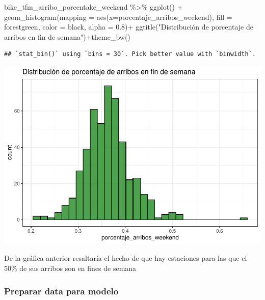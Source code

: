 \documentclass[
]{article}
\newenvironment{Shaded}{\begin{snugshade}}{\end{snugshade}}
\newcommand{\AttributeTok}[1]{\textcolor[rgb]{0.77,0.63,0.00}{#1}}
\newcommand{\FloatTok}[1]{\textcolor[rgb]{0.00,0.00,0.81}{#1}}
\newcommand{\FunctionTok}[1]{\textcolor[rgb]{0.00,0.00,0.00}{#1}}
\newcommand{\NormalTok}[1]{#1}
\newcommand{\SpecialCharTok}[1]{\textcolor[rgb]{0.00,0.00,0.00}{#1}}
\newcommand{\StringTok}[1]{\textcolor[rgb]{0.31,0.60,0.02}{#1}}
\begin{document}
\begin{Shaded}
\begin{Highlighting}[]
\NormalTok{bike\_tfm\_arribo\_porcentake\_weekend }\SpecialCharTok{\%\textgreater{}\%} 
    \FunctionTok{ggplot}\NormalTok{() }\SpecialCharTok{+}
    \FunctionTok{geom\_histogram}\NormalTok{(}\AttributeTok{mapping =} \FunctionTok{aes}\NormalTok{(}\AttributeTok{x=}\NormalTok{porcentaje\_arribos\_weekend),}
                   \AttributeTok{fill =} \StringTok{\textquotesingle{}forestgreen\textquotesingle{}}\NormalTok{,}
                   \AttributeTok{color =} \StringTok{\textquotesingle{}black\textquotesingle{}}\NormalTok{,}
                   \AttributeTok{alpha =} \FloatTok{0.8}\NormalTok{)}\SpecialCharTok{+} \FunctionTok{ggtitle}\NormalTok{(}\StringTok{"Distribución de porcentaje de arribos en fin de semana"}\NormalTok{)}\SpecialCharTok{+}\FunctionTok{theme\_bw}\NormalTok{()}
\end{Highlighting}
\end{Shaded}

\begin{verbatim}
## `stat_bin()` using `bins = 30`. Pick better value with `binwidth`.
\end{verbatim}

\includegraphics{Ecobici_files/figure-latex/unnamed-chunk-10-1.pdf}

De la gráfica anterior resaltaría el hecho de que hay estaciones para
las que el 50\% de sus arribos son en fines de semana

\hypertarget{preparar-data-para-modelo}{%
\subsubsection{Preparar data para
modelo}\label{preparar-data-para-modelo}}
\end{document}
